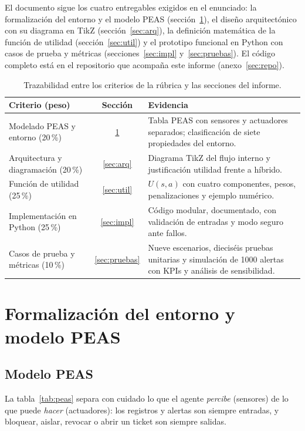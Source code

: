 \documentclass[11pt,a4paper]{article}
\begin{document}
El documento sigue los cuatro entregables exigidos en el enunciado: la formalización del entorno y el modelo PEAS (sección~\ref{sec:peas}), el diseño arquitectónico con su diagrama en TikZ (sección~\ref{sec:arq}), la definición matemática de la función de utilidad (sección~\ref{sec:util}) y el prototipo funcional en Python con casos de prueba y métricas (secciones~\ref{sec:impl} y~\ref{sec:pruebas}). El código completo está en el repositorio que acompaña este informe (anexo~\ref{sec:repo}).

\begin{table}[H]
\centering
\caption{Trazabilidad entre los criterios de la rúbrica y las secciones del informe.}
\small
\begin{tabularx}{\textwidth}{>{\raggedright\arraybackslash}p{4.2cm}cX}
\toprule
Criterio (peso) & Sección & Evidencia \\
\midrule
Modelado PEAS y entorno (20\,\%) & \ref{sec:peas} & Tabla PEAS con sensores y actuadores separados; clasificación de siete propiedades del entorno. \\
Arquitectura y diagramación (20\,\%) & \ref{sec:arq} & Diagrama TikZ del flujo interno y justificación utilidad frente a híbrido. \\
Función de utilidad (25\,\%) & \ref{sec:util} & $U(s,a)$ con cuatro componentes, pesos, penalizaciones y ejemplo numérico. \\
Implementación en Python (25\,\%) & \ref{sec:impl} & Código modular, documentado, con validación de entradas y modo seguro ante fallos. \\
Casos de prueba y métricas (10\,\%) & \ref{sec:pruebas} & Nueve escenarios, dieciséis pruebas unitarias y simulación de 1000 alertas con KPIs y análisis de sensibilidad. \\
\bottomrule
\end{tabularx}
\end{table}

\section{Formalización del entorno y modelo PEAS}\label{sec:peas}

\subsection{Modelo PEAS}

La tabla~\ref{tab:peas} separa con cuidado lo que el agente \emph{percibe} (sensores) de lo que puede \emph{hacer} (actuadores): los registros y alertas son siempre entradas, y bloquear, aislar, revocar o abrir un ticket son siempre salidas.
\end{document}

